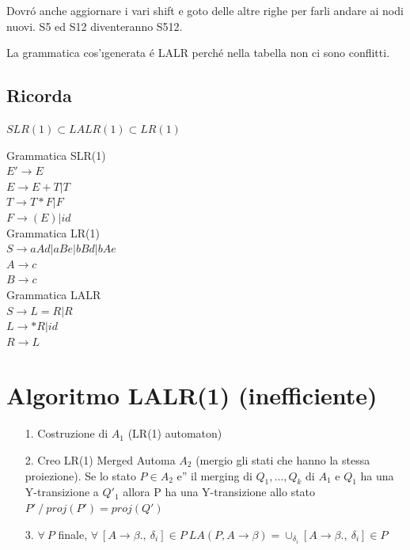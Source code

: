 Dovr\'o anche aggiornare i vari shift e goto delle altre righe per farli andare ai nodi nuovi. S5 ed S12 diventeranno S512.

La grammatica cos'\i generata \'e LALR perch\'e nella tabella non ci sono conflitti.

\subsection{Ricorda}
$ SLR(1) \subset LALR(1) \subset LR(1)$

Grammatica SLR(1)\\
$E' \rightarrow E$\\
$E \rightarrow E + T | T$\\
$T \rightarrow T * F | F$\\
$F \rightarrow (E) | id $\\

Grammatica LR(1)\\
$S \rightarrow aAd | aBe | bBd |bAe $\\
$A \rightarrow c$\\
$B \rightarrow c$\\

Grammatica LALR\\
$S \rightarrow L = R | R$\\
$L \rightarrow *R|id$\\
$R \rightarrow L$\\

\section{Algoritmo LALR(1) (inefficiente)}
\begin{itemize}
	\item[1.] 	Costruzione di $A_1$ (LR(1) automaton) \\
	\item[2.] 	Creo LR(1) Merged Automa $A_2$ (mergio gli stati che hanno la stessa proiezione). 
				Se lo stato $P \in A_2$ e'' il merging di $Q_1, ..., Q_k$ di $A_1$ e $Q_1$ ha una Y-transizione a $Q'_1$ allora 
				P ha una Y-transizione allo stato $P' \ / \ proj(P') = proj(Q') $\\
	\item[3.] 	$\forall\ P$ finale, $\forall\ [ A \rightarrow \beta.,\ \delta_i] \in P\ 
				LA(P, A \rightarrow \beta) = \cup_{\delta_i} [A \rightarrow \beta .,\ \delta _i] \in P$\\
\end{itemize}

